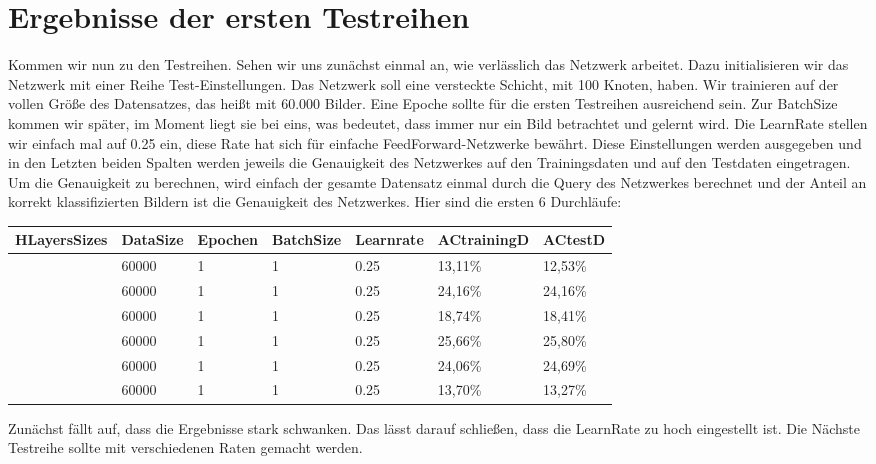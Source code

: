 \documentclass[12pt]{article}
\begin{document}
\section{Ergebnisse der ersten Testreihen}
Kommen wir nun zu den Testreihen. Sehen wir uns zunächst einmal an, wie verlässlich das Netzwerk arbeitet. Dazu initialisieren wir das Netzwerk mit einer Reihe Test-Einstellungen. Das Netzwerk soll eine versteckte Schicht, mit 100 Knoten, haben. Wir trainieren auf der vollen Größe des Datensatzes, das heißt mit 60.000 Bilder. Eine Epoche sollte für die ersten Testreihen ausreichend sein. Zur BatchSize kommen wir später, im Moment liegt sie bei eins, was bedeutet, dass immer nur ein Bild betrachtet und gelernt wird. Die LearnRate stellen wir einfach mal auf 0.25 ein, diese Rate hat sich für einfache FeedForward-Netzwerke bewährt. Diese Einstellungen werden ausgegeben und in den Letzten beiden Spalten werden jeweils die Genauigkeit des Netzwerkes auf den Trainingsdaten und auf den Testdaten eingetragen. Um die Genauigkeit zu berechnen, wird einfach der gesamte Datensatz einmal durch die Query des Netzwerkes berechnet und der Anteil an korrekt klassifizierten Bildern ist die Genauigkeit des Netzwerkes.
Hier sind die ersten 6 Durchläufe:
\begin{table}[H]
    \centering
    \begin{tabular}{|l|l|l|l|l|l|l|}
    \hline
        HLayersSizes & DataSize & Epochen & BatchSize & Learnrate & ACtrainingD & ACtestD \\ \hline
        [780, 100, 10] & 60000 & 1 & 1 & 0.25 & 13,11\% & 12,53\% \\ \hline
        [780, 100, 10] & 60000 & 1 & 1 & 0.25 & 24,16\% & 24,16\% \\ \hline
        [780, 100, 10] & 60000 & 1 & 1 & 0.25 & 18,74\% & 18,41\% \\ \hline
        [780, 100, 10] & 60000 & 1 & 1 & 0.25 & 25,66\% & 25,80\% \\ \hline
        [780, 100, 10] & 60000 & 1 & 1 & 0.25 & 24,06\% & 24,69\% \\ \hline
        [780, 100, 10] & 60000 & 1 & 1 & 0.25 & 13,70\% & 13,27\% \\ \hline
    \end{tabular}
\end{table}
Zunächst fällt auf, dass die Ergebnisse stark schwanken. Das lässt darauf schließen, dass die LearnRate zu hoch eingestellt ist. Die Nächste Testreihe sollte mit verschiedenen Raten gemacht werden.
\end{document}
